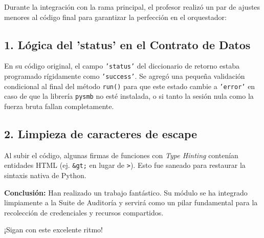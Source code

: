 \documentclass[12pt,a4paper]{article}
\begin{document}
Durante la integración con la rama principal, el profesor realizó un par de ajustes menores al código final para garantizar la perfección en el orquestador:

\subsection*{1. Lógica del 'status' en el Contrato de Datos}
En su código original, el campo \texttt{'status'} del diccionario de retorno estaba programado rígidamente como \texttt{'success'}. Se agregó una pequeña validación condicional al final del método \texttt{run()} para que este estado cambie a \texttt{'error'} en caso de que la librería \texttt{pysmb} no esté instalada, o si tanto la sesión nula como la fuerza bruta fallan completamente.

\subsection*{2. Limpieza de caracteres de escape}
Al subir el código, algunas firmas de funciones con \textit{Type Hinting} contenían entidades HTML (ej. \texttt{\&gt;} en lugar de \texttt{>}). Esto fue saneado para restaurar la sintaxis nativa de Python.

\vspace{1cm}
\noindent \textbf{Conclusión:} Han realizado un trabajo fantástico. Su módulo se ha integrado limpiamente a la Suite de Auditoría y servirá como un pilar fundamental para la recolección de credenciales y recursos compartidos.

\vspace{0.5cm}
\noindent ¡Sigan con este excelente ritmo!
\end{document}
